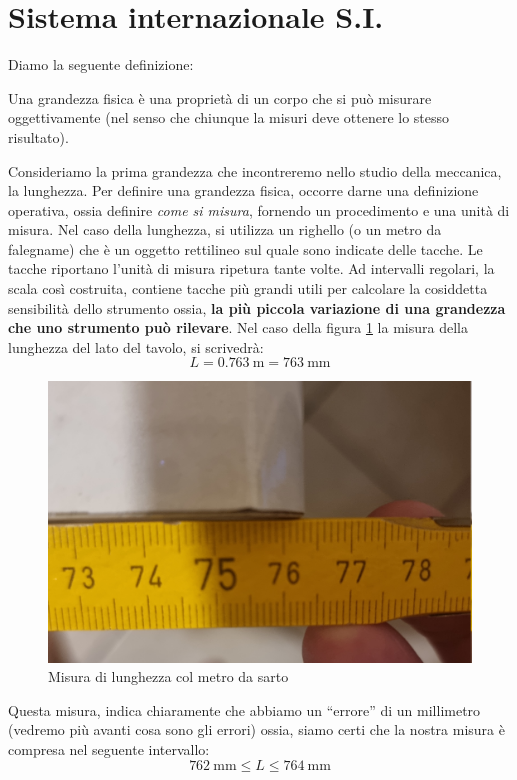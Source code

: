\section{Sistema internazionale S.I.}

Diamo la seguente definizione:
\begin{grf}
	Una grandezza fisica è una proprietà di un corpo che si può misurare oggettivamente (nel senso che chiunque la misuri deve ottenere lo stesso risultato).
\end{grf}
 Consideriamo la prima grandezza che incontreremo nello studio della meccanica, la lunghezza. Per definire una grandezza fisica, occorre darne una definizione operativa, ossia definire \textit{come si misura}, fornendo un procedimento e una unità di misura. Nel caso della lunghezza, si utilizza un righello (o un metro da falegname) che è un oggetto rettilineo sul quale sono indicate delle tacche. Le tacche riportano l'unità di misura ripetura tante volte. Ad intervalli regolari, la scala così costruita, contiene tacche più grandi utili per calcolare la cosiddetta sensibilità dello strumento ossia, \textbf{la più piccola variazione di una grandezza che uno strumento può rilevare}. Nel caso della  figura \ref{fig:lun} la misura della lunghezza del lato del tavolo, si scrivedrà:
 \[
 L=\SI{0,763}{\meter} =\SI{763}{\milli\meter}
 \]
 
    \begin{figure}[h!]
    \centering
    \includegraphics[width=0.5\linewidth]{path_to_image/lun.jpg} 
    \caption{Misura di lunghezza col metro da sarto}
    \label{fig:lun}
\end{figure}  
 
Questa misura, indica chiaramente che abbiamo un ``errore'' di un millimetro (vedremo più avanti cosa sono gli errori) ossia, siamo certi che la nostra misura è compresa nel seguente intervallo:
\[
\SI{762}{\milli\meter} \le L \le \SI{764}{\milli\meter}
\]


